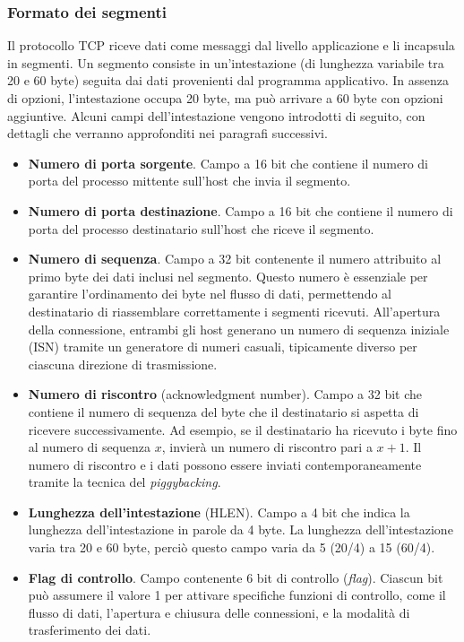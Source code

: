 \documentclass[12pt]{report}
\begin{document}
	\subsubsection{Formato dei segmenti}
	Il protocollo TCP riceve dati come messaggi dal livello applicazione e li incapsula in segmenti. Un segmento consiste in un'intestazione (di lunghezza variabile tra 20 e 60 byte) seguita dai dati provenienti dal programma applicativo. In assenza di opzioni, l'intestazione occupa 20 byte, ma può arrivare a 60 byte con opzioni aggiuntive. Alcuni campi dell'intestazione vengono introdotti di seguito, con dettagli che verranno approfonditi nei paragrafi successivi.
	\begin{itemize}
		\item \textbf{Numero di porta sorgente}. Campo a 16 bit che contiene il numero di porta del processo mittente sull'host che invia il segmento.
	
		\item \textbf{Numero di porta destinazione}. Campo a 16 bit che contiene il numero di porta del processo destinatario sull'host che riceve il segmento.
	
		\item \textbf{Numero di sequenza}. Campo a 32 bit contenente il numero attribuito al primo byte dei dati inclusi nel segmento. Questo numero è essenziale per garantire l'ordinamento dei byte nel flusso di dati, permettendo al destinatario di riassemblare correttamente i segmenti ricevuti. All'apertura della connessione, entrambi gli host generano un numero di sequenza iniziale (ISN) tramite un generatore di numeri casuali, tipicamente diverso per ciascuna direzione di trasmissione.
	
		\item \textbf{Numero di riscontro} (acknowledgment number). Campo a 32 bit che contiene il numero di sequenza del byte che il destinatario si aspetta di ricevere successivamente. Ad esempio, se il destinatario ha ricevuto i byte fino al numero di sequenza $x$, invierà un numero di riscontro pari a $x + 1$. Il numero di riscontro e i dati possono essere inviati contemporaneamente tramite la tecnica del \textit{piggybacking}.
	
		\item \textbf{Lunghezza dell'intestazione} (HLEN). Campo a 4 bit che indica la lunghezza dell'intestazione in parole da 4 byte. La lunghezza dell'intestazione varia tra 20 e 60 byte, perciò questo campo varia da 5 (20/4) a 15 (60/4).
	
		\item \textbf{Flag di controllo}. Campo contenente 6 bit di controllo (\textit{flag}). Ciascun bit può assumere il valore 1 per attivare specifiche funzioni di controllo, come il flusso di dati, l'apertura e chiusura delle connessioni, e la modalità di trasferimento dei dati.
	

\end{itemize}
\end{document}
